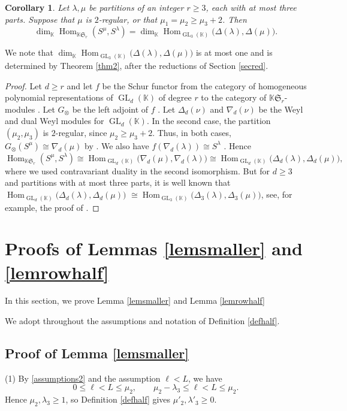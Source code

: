 \documentclass[11pt]{amsart}
\newtheorem{corollary}[theorem]{Corollary}
\theoremstyle{remark}
\theoremstyle{definition}
\newcommand{\Hom}{\operatorname{Hom}}
\newcommand{\GL}{\operatorname{GL}}
\newcommand{\la}{\lambda}
\newcommand{\K}{\mathbb K}
\numberwithin{equation}{section}
\begin{document}
	\begin{corollary}\label{specht} Let
		$\la,\mu$ be partitions of an integer $r\ge3$, each with at
		most three parts. Suppose that $\mu$ is $2$-regular, or that
		$\mu_1=\mu_2\ge\mu_3+2$. Then
		\[
		\dim_\K\Hom_{\K\mathfrak S_r}(S^\mu,S^\la)
		=\dim_\K\Hom_{\GL_3(\K)}\bigl(\Delta(\la),\Delta(\mu)\bigr).
		\] 
	\end{corollary}
	We note that $\dim_\K\Hom_{\GL_3(\K)}\bigl(\Delta(\la),\Delta(\mu)\bigr)$ is at most one 
	and is determined by Theorem \ref{thm2}, after the reductions
	of Section \ref{secred}.
	\begin{proof}
		Let $d \ge r$  and let $f$ be the Schur functor from the category of homogeneous polynomial representations of $\GL_d(\K)$ of degree $r$ to the category of  $\K\mathfrak{S}_r$-modules \cite[Section 6.1]{Gr}. Let
		 $G_\otimes$ be the left adjoint of $f$ \cite[Definition 3.3]{McD}. Let $\Delta_d(\nu)$ and
		$\nabla_d(\nu)$ be the Weyl and dual Weyl modules for
		$\GL_d(\K)$. In the second case, the partition $(\mu_2,\mu_3)$ is $2$-regular,
		since $\mu_2\ge\mu_3+2$. Thus, in both cases,
		$G_\otimes(S^\mu)\cong\nabla_d(\mu)$
		by \cite[Theorem 1.2]{McD}. We also have
		$f(\nabla_d(\la))\cong S^\la$ \cite[Section 6.3]{Gr}. Hence 
	$
			\Hom_{\K\mathfrak S_r}(S^\mu,S^\la)
			\cong\Hom_{\GL_d(\K)}
			\bigl(\nabla_d(\mu),\nabla_d(\la)\bigr)
			\cong\Hom_{\GL_d(\K)}
			\bigl(\Delta_d(\la),\Delta_d(\mu)\bigr),
		$
	where we used contravariant duality in the second isomorphism. But for $d \ge3$ and partitions with at most three parts, it is well known that $\Hom_{\GL_d(\K)}
	\bigl(\Delta_d(\la),\Delta_d(\mu)\bigr)$ $ \cong \Hom_{\GL_3(\K)}
	\bigl(\Delta_3(\la),\Delta_3(\mu)\bigr)$, see, for example, the proof of \cite[Proposition 1.1]{Ku}. \end{proof}
\section{Proofs of Lemmas \ref{lemsmaller} and \ref{lemrowhalf}}\label{lemproofs} In this section, we prove Lemma \ref{lemsmaller} and Lemma \ref{lemrowhalf}

We adopt throughout the assumptions and notation of Definition \ref{defhalf}.
\subsection{Proof of Lemma \ref{lemsmaller}}\label{proof33}
(1) By \eqref{assumptions2} and the assumption $\ell<L$,
we have
\[
0\le\ell<L\le\mu_2,\qquad
\mu_2-\la_3\le\ell<L\le\mu_2.
\]
Hence $\mu_2,\la_3\ge1$, so Definition \ref{defhalf}
gives $\mu'_2,\la'_3\ge0$.
\end{document}
